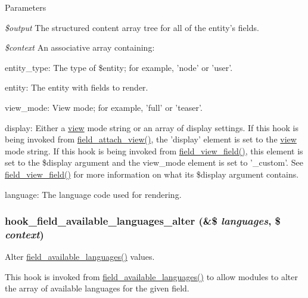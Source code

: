 \begin{DoxyParams}{Parameters}
\item[{\em \$output}]The structured content array tree for all of the entity's fields. \item[{\em \$context}]An associative array containing:
\begin{DoxyItemize}
\item entity\_\-type: The type of \$entity; for example, 'node' or 'user'.
\item entity: The entity with fields to render.
\item view\_\-mode: View mode; for example, 'full' or 'teaser'.
\item display: Either a \hyperlink{classview}{view} mode string or an array of display settings. If this hook is being invoked from \hyperlink{group__field__attach_gaa752a8fd31173fd2308d71eb059e00c7}{field\_\-attach\_\-view()}, the 'display' element is set to the \hyperlink{classview}{view} mode string. If this hook is being invoked from \hyperlink{group__field_gacb7c7349bbe181c174421e23210ae1ba}{field\_\-view\_\-field()}, this element is set to the \$display argument and the view\_\-mode element is set to '\_\-custom'. See \hyperlink{group__field_gacb7c7349bbe181c174421e23210ae1ba}{field\_\-view\_\-field()} for more information on what its \$display argument contains.
\item language: The language code used for rendering. 
\end{DoxyItemize}\end{DoxyParams}
\hypertarget{group__field__attach_gaea2e719de3ad070e161d0d386dd18303}{
\subsubsection[{hook\_\-field\_\-available\_\-languages\_\-alter}]{\setlength{\rightskip}{0pt plus 5cm}hook\_\-field\_\-available\_\-languages\_\-alter (\&\$ {\em languages}, \/  \$ {\em context})}}
\label{group__field__attach_gaea2e719de3ad070e161d0d386dd18303}
Alter \hyperlink{group__field__language_ga3dbd9611836d9bba15c15f0a8ae83c9b}{field\_\-available\_\-languages()} values.

This hook is invoked from \hyperlink{group__field__language_ga3dbd9611836d9bba15c15f0a8ae83c9b}{field\_\-available\_\-languages()} to allow modules to alter the array of available languages for the given field.


